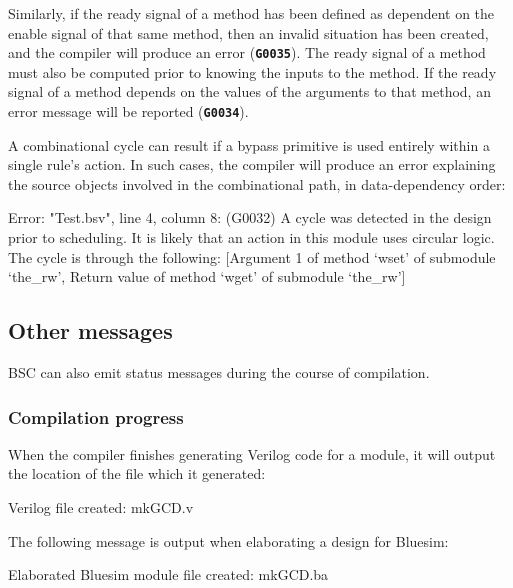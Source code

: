 \documentclass{article}
\newenvironment{centerboxverbatim}
  {\center
   \boxedverbatim}
  {\endboxedverbatim
  {\endcenter }}
\begin{document}
Similarly, if the ready signal of a method has been defined as dependent
on the enable signal of that same method, then an invalid situation has
been created, and the compiler will produce an error ({\bf\tt G0035}).
The ready signal of a method must also be computed prior to knowing the
inputs to the method.  If the ready signal of a method depends on the
values of the arguments to that method, an error message will be
reported ({\bf\tt G0034}).

A combinational cycle can result if a bypass primitive is used
entirely within a single rule's action.  In such cases, the compiler
will produce an error explaining the source objects involved in the
combinational path, in data-dependency order:

\begin{centerboxverbatim}
Error: "Test.bsv", line 4, column 8: (G0032)
  A cycle was detected in the design prior to scheduling. It is likely that
  an action in this module uses circular logic. The cycle is through the
  following:
    [Argument 1 of method `wset' of submodule `the_rw',
     Return value of method `wget' of submodule `the_rw']
\end{centerboxverbatim}


\subsection{Other messages}

BSC can also emit status messages during the course of compilation.


\subsubsection{Compilation progress}
\label{sec-progress-messages}

When the compiler finishes generating Verilog code for a module, it
will output the location of the file which it generated:

\begin{centerboxverbatim}
Verilog file created: mkGCD.v
\end{centerboxverbatim}

The following message is output when elaborating a design for Bluesim:

\begin{centerboxverbatim}
Elaborated Bluesim module file created: mkGCD.ba
\end{centerboxverbatim}
\end{document}
